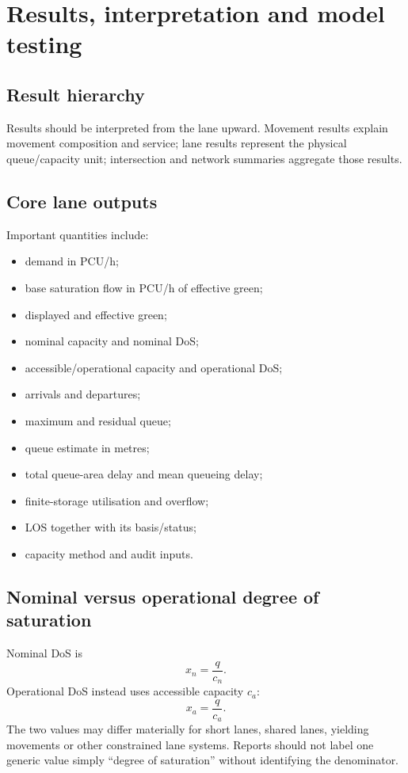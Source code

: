 \chapter{Results, interpretation and model testing}
\label{chap:results-testing}

\section{Result hierarchy}
Results should be interpreted from the lane upward.  Movement results explain movement
composition and service; lane results represent the physical queue/capacity unit;
intersection and network summaries aggregate those results.

\section{Core lane outputs}
Important quantities include:
\begin{itemize}
\item demand in PCU/h;
\item base saturation flow in PCU/h of effective green;
\item displayed and effective green;
\item nominal capacity and nominal DoS;
\item accessible/operational capacity and operational DoS;
\item arrivals and departures;
\item maximum and residual queue;
\item queue estimate in metres;
\item total queue-area delay and mean queueing delay;
\item finite-storage utilisation and overflow;
\item LOS together with its basis/status;
\item capacity method and audit inputs.
\end{itemize}

\section{Nominal versus operational degree of saturation}
Nominal DoS is
\begin{equation}
x_n=\frac{q}{c_n}.
\end{equation}
Operational DoS instead uses accessible capacity $c_a$:
\begin{equation}
x_a=\frac{q}{c_a}.
\end{equation}
The two values may differ materially for short lanes, shared lanes, yielding movements
or other constrained lane systems.  Reports should not label one generic value simply
``degree of saturation'' without identifying the denominator.

